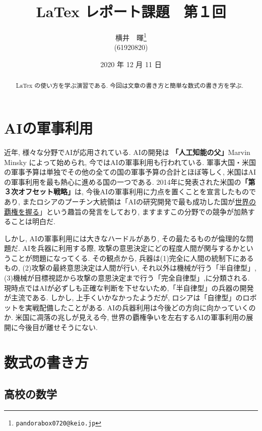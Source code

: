 \documentclass[a4paper,12pt]{jarticle}
\begin{document}
\title{LaTex レポート課題　第１回
}
\author{横井　暉\thanks{\texttt{pandorabox0720@keio.jp}}\\(61920820)}
\date{2020 年 12 月 11 日}
%
\maketitle

\begin{abstract}
LaTex の使い方を学ぶ演習である. 今回は文章の書き方と簡単な数式の書き方を学ぶ.
\end{abstract}

\section{AIの軍事利用}
近年, 様々な分野でAIが応用されている. AIの開発は \textbf{「人工知能の父」}{\Huge Marvin Minsky} によって始められ, 今ではAIの軍事利用も行われている.
軍事大国・米国の軍事予算は単独でその他の全ての国の軍事予算の合計とほぼ等しく, 米国はAIの軍事利用を最も熱心に進める国の一つである. 2014年に発表された米国の\textbf{「第３次オフセット戦略」}は, 今後AIの軍事利用に力点を置くことを宣言したものであり, またロシアの{\tiny プーチン大統領}は「AIの研究開発で最も成功した国が\underline{世界の覇権を握る}」という趣旨の発言をしており, ますますこの分野での競争が加熱することは明白だ.

しかし, AIの軍事利用には大きなハードルがあり, その最たるものが倫理的な問題だ. AIを兵器に利用する際, 攻撃の意思決定にどの程度人間が関与するかということが問題になってくる. その観点から, 兵器は(1)完全に人間の統制下にあるもの, (2)攻撃の最終意思決定は人間が行い, それ以外は機械が行う「半自律型」, (3)機械が目標視認から攻撃の意思決定まで行う「完全自律型」,に分類される. 現時点ではAIが必ずしも正確な判断を下せないため,「半自律型」の兵器の開発が主流である. しかし, 上手くいかなかったようだが, ロシアは「自律型」のロボットを実戦配備したことがある. AIの兵器利用は今後どの方向に向かっていくのか. 米国に凋落の兆しが見える今, 世界の覇権争いを左右するAIの軍事利用の展開に今後目が離せそうにない.    

\section{数式の書き方}

\subsection{高校の数学}
\end{document}
